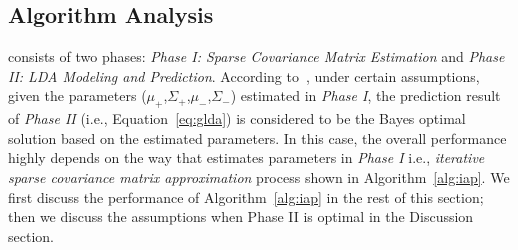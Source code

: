 \subsection{Algorithm Analysis}
\label{sec:analysis}

\TheName{} consists of two phases: \emph{Phase I: Sparse Covariance Matrix Estimation} and \emph{Phase II: LDA Modeling and Prediction}.
According to~\cite{hamsici2008bayes}, under certain assumptions, given the parameters ($\mu_+$,$\Sigma_+$,$\mu_-$,$\Sigma_-$) estimated in \emph{Phase I}, the prediction result of \emph{Phase II} (i.e., Equation~\ref{eq:glda}) is considered to be the Bayes optimal solution based on the estimated parameters.
In this case, the overall performance highly depends on the way that \TheName{} estimates parameters in \emph{Phase I} i.e., \emph{iterative sparse covariance matrix approximation} process shown in Algorithm~\ref{alg:iap}.
We first discuss the performance of Algorithm~\ref{alg:iap} in the rest of this section; then we discuss the assumptions when Phase II is optimal in the Discussion section.

